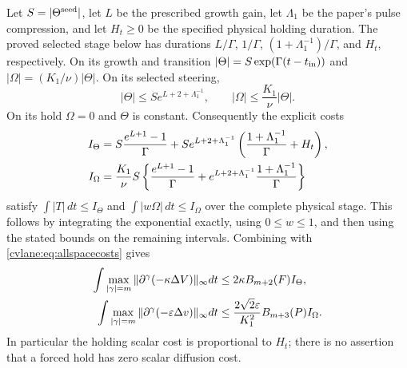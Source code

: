 Let $S=|\Theta^{\rm seed}|$, let $L$ be the prescribed growth gain,
let $\Lambda_1$ be the paper's pulse compression, and let $H_t\geq0$
be the specified physical holding duration. The proved selected stage
below has durations $L/\Gamma$, $1/\Gamma$,
$(1+\Lambda_1^{-1})/\Gamma$, and $H_t$, respectively. On its
growth and transition $|\Theta|=S\exp(\Gamma(t-t_{\rm in}))$
and $|\Omega|=(K_1/\nu)|\Theta|$. On its selected steering,
\[
 |\Theta|\leq S e^{L+2+\Lambda_1^{-1}},\qquad
 |\Omega|\leq\frac{K_1}{\nu}|\Theta|.
\]
On its hold $\Omega=0$ and $\Theta$ is constant. Consequently
the explicit costs
\begin{align}
 I_\Theta={}&S\frac{e^{L+1}-1}{\Gamma}
 +S e^{L+2+\Lambda_1^{-1}}
 \left(\frac{1+\Lambda_1^{-1}}\Gamma+H_t\right),\notag\\
 I_\Omega={}&\frac{K_1}{\nu}S\left\{
 \frac{e^{L+1}-1}{\Gamma}
 +e^{L+2+\Lambda_1^{-1}}\frac{1+\Lambda_1^{-1}}\Gamma\right\}
 \label{cvlane:eq:integratedamps}
\end{align}
satisfy $\int|T|\,dt\leq I_\Theta$ and
$\int|w\Omega|\,dt\leq I_\Omega$ over the complete physical
stage. This follows by integrating the exponential exactly,
using $0\leq w\leq1$, and then using the stated bounds on the
remaining intervals. Combining with \eqref{cvlane:eq:allspacecosts} gives
\begin{align}
 \int\max_{|\gamma|=m}\|\partial^\gamma(-\kappa\Delta V)\|_\infty dt
 &\leq2\kappa B_{m+2}(F)I_\Theta,\notag\\
 \int\max_{|\gamma|=m}\|\partial^\gamma(-\varepsilon\Delta v)\|_\infty dt
 &\leq\frac{2\sqrt2\varepsilon}{K_1^2}B_{m+3}(P)I_\Omega.
 \label{cvlane:eq:integratedcosts}
\end{align}
In particular the holding scalar cost is proportional to $H_t$;
there is no assertion that a forced hold has zero scalar diffusion cost.

